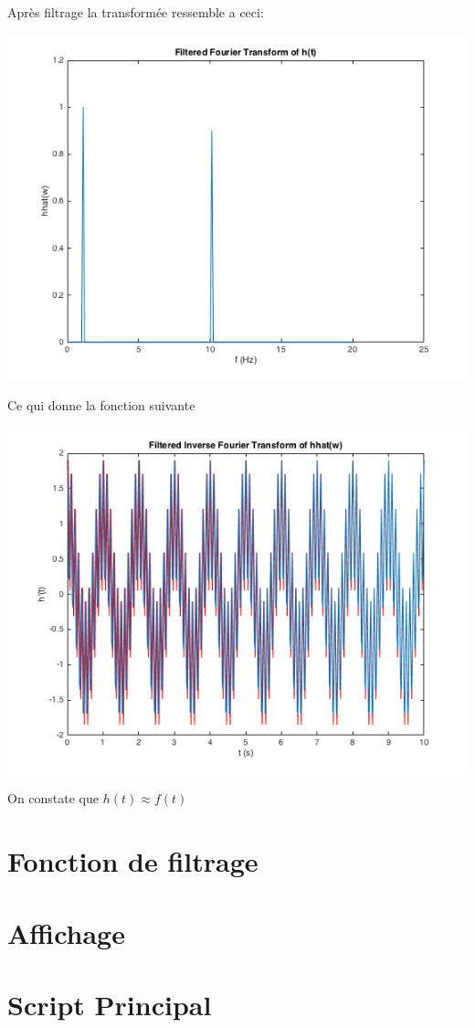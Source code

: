 \documentclass[a4paper,11pt]{article}
\begin{document}
Après filtrage la transformée ressemble a ceci:
\begin{center}
\includegraphics[scale=0.6]{"hhat_filtre.png"} \newline
\end{center}
Ce qui donne la fonction suivante
\begin{center}
\includegraphics[scale=0.6]{"h_filtre.png"} \newline
\end{center}

On constate que $h(t) \approx f(t)$
\section{Fonction de filtrage}

\section{Affichage}

\section{Script Principal}
\end{document}
